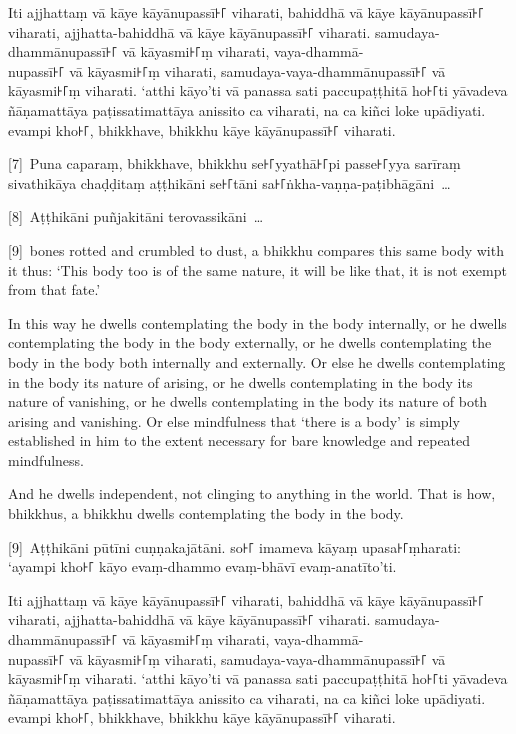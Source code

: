 Iti ajjhattaṃ vā kāye kāyānupassī꜔꜒ viharati, bahiddhā vā kāye kāyānupassī꜔꜒
viharati, ajjhatta-bahiddhā vā kāye kāyānupassī꜔꜒ viharati. samudaya-dhammānupassī꜔꜒
vā kāyasmi꜔꜒ṃ viharati, vaya-dhammā-\\
nupassī꜔꜒ vā kāyasmi꜔꜒ṃ viharati, samudaya-vaya-dhammānupassī꜔꜒ vā kāyasmi꜔꜒ṃ viharati.
‘atthi kāyo’ti vā panassa sati paccupaṭṭhitā ho꜔꜒ti yāvadeva ñāṇamattāya
paṭissatimattāya anissito ca viharati, na ca kiñci loke upādiyati. evampi kho꜔꜒,
bhikkhave, bhikkhu kāye kāyānupassī꜔꜒ viharati.

[7]~Puna caparaṃ, bhikkhave, bhikkhu se꜔꜒yyathā꜔꜒pi passe꜔꜒yya sarīraṃ sivathikāya
chaḍḍitaṃ aṭṭhikāni se꜔꜒tāni sa꜔꜒ṅkha-vaṇṇa-paṭibhāgāni~\ldots{}

[8]~Aṭṭhikāni puñjakitāni terovassikāni~\ldots{}

\englishPage

[9]~bones rotted and crumbled to dust, a bhikkhu compares this same
body with it thus: ‘This body too is of the same nature, it will be like that,
it is not exempt from that fate.’

In this way he dwells contemplating the body in the body internally, or he
dwells contemplating the body in the body externally, or he dwells contemplating
the body in the body both internally and externally. Or else he dwells
contemplating in the body its nature of arising, or he dwells contemplating in
the body its nature of vanishing, or he dwells contemplating in the body its
nature of both arising and vanishing. Or else mindfulness that ‘there is a body’
is simply established in him to the extent necessary for bare knowledge and
repeated mindfulness.

And he dwells independent, not clinging to anything in the world. That is how,
bhikkhus, a bhikkhu dwells contemplating the body in the body.



\paliPage

[9]~Aṭṭhikāni pūtīni cuṇṇakajātāni. so꜔꜒ imameva kāyaṃ upasa꜔꜒ṃharati: ‘ayampi kho꜔꜒
kāyo evaṃ-dhammo evaṃ-bhāvī evaṃ-anatīto’ti.

Iti ajjhattaṃ vā kāye kāyānupassī꜔꜒ viharati, bahiddhā vā kāye kāyānupassī꜔꜒
viharati, ajjhatta-bahiddhā vā kāye kāyānupassī꜔꜒ viharati. samudaya-dhammānupassī꜔꜒
vā kāyasmi꜔꜒ṃ viharati, vaya-dhammā-\\
nupassī꜔꜒ vā kāyasmi꜔꜒ṃ viharati, samudaya-vaya-dhammānupassī꜔꜒ vā kāyasmi꜔꜒ṃ viharati.
‘atthi kāyo’ti vā panassa sati paccupaṭṭhitā ho꜔꜒ti yāvadeva ñāṇamattāya
paṭissatimattāya anissito ca viharati, na ca kiñci loke upādiyati. evampi kho꜔꜒,
bhikkhave, bhikkhu kāye kāyānupassī꜔꜒ viharati.

